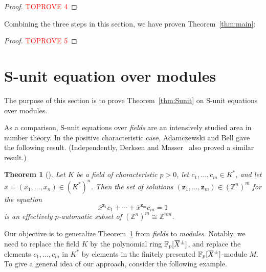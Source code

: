 \documentclass[a4paper,UKenglish,cleveref, autoref, thm-restate]{lipics-v2021}
\newcommand{\Z}{\mathbb{Z}}
\newcommand{\F}{\mathbb{F}}
\newcommand{\bz}{\boldsymbol{z}}
\newcommand{\oX}{\mkern 1.5mu\overline{\mkern-1.5mu X \mkern-1.5mu}\mkern 1.5mu}
\newcommand{\ox}{\overline{x}}
\newtheorem{thrm}{Theorem}[section]
\theoremstyle{definition}
\theoremstyle{definition}
\theoremstyle{definition}
\begin{document}
\thmSunit*

\begin{proof}\textcolor{red}{TOPROVE 4}\end{proof}

Combining the three steps in this section, we have proven Theorem~\ref{thm:main}:

\begin{proof}\textcolor{red}{TOPROVE 5}\end{proof}

\section{S-unit equation over modules}\label{sec:Sunit}

The purpose of this section is to prove Theorem~\ref{thm:Sunit} on S-unit equations over modules.

\thmSunit*

As a comparison, S-unit equations over \emph{fields} are an intensively studied area in number theory. In the positive characteristic case, Adamczewski and Bell gave the following result. (Independently, Derksen and Masser~\cite{derksen2012linear} also proved a similar result.)
\begin{thrm}[{\cite[Theorem~3.1]{adamczewski2012vanishing}}]\label{thm:Sunitexample}
    Let $K$ be a field of characteristic $p > 0$, let $c_1, \ldots , c_m \in K^*$, and let $\ox = (x_1, \ldots, x_n) \in \left(K^*\right)^n$. Then the set of solutions $(\bz_1, \ldots, \bz_m) \in \left(\Z^n\right)^m$ for the equation
    \begin{equation*}
        \ox^{\bz_1} c_1 + \cdots + \ox^{\bz_m} c_m = 1
    \end{equation*}
    is an effectively $p$-automatic subset of $\left(\Z^n\right)^m \cong \Z^{nm}$.
\end{thrm}
Our objective is to generalize Theorem~\ref{thm:Sunitexample} from \emph{fields} to \emph{modules}. Notably, we need to replace the field $K$ by the polynomial ring $\F_p[\oX^{\pm}]$, and replace the elements $c_1, \ldots , c_m$ in $K^*$ by elements in the finitely presented $\F_p[\oX^{\pm}]$-module $M$. 
To give a general idea of our approach, consider the following example.
\end{document}
